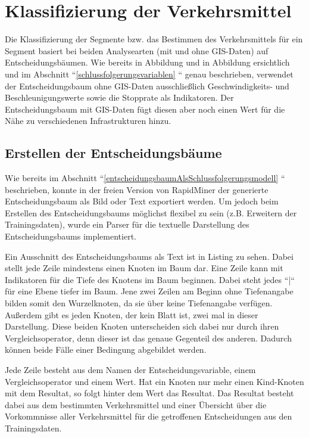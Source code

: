 \section{Klassifizierung der Verkehrsmittel}
Die Klassifizierung der Segmente bzw. das Bestimmen des Verkehrsmittels für ein Segment basiert bei beiden Analysearten (mit und ohne GIS-Daten) auf Entscheidungsbäumen. Wie bereits in Abbildung  und in Abbildung  ersichtlich und im Abschnitt ``\ref{schlussfolgerungsvariablen} `` genau beschrieben, verwendet der Entscheidungsbaum ohne GIS-Daten ausschließlich Geschwindigkeits- und Beschleunigungswerte sowie die Stopprate als Indikatoren. Der Entscheidungsbaum mit GIS-Daten fügt diesen aber noch einen Wert für die Nähe zu verschiedenen Infrastrukturen hinzu.

\subsection{Erstellen der Entscheidungsbäume}
\label{entscheidungsbaumGenerierungPHP}
Wie bereits im Abschnitt ``\ref{entscheidungsbaumAlsSchlussfolgerungsmodell} `` beschrieben, konnte in der freien Version von RapidMiner der generierte Entscheidungsbaum als Bild oder Text exportiert werden. Um jedoch beim Erstellen des Entscheidungsbaums möglichst flexibel zu sein (z.B. Erweitern der Trainingsdaten), wurde ein Parser für die textuelle Darstellung des Entscheidungsbaums implementiert. 

Ein Ausschnitt des Entscheidungsbaums als Text ist in Listing  zu sehen. Dabei stellt jede Zeile mindestens einen Knoten im Baum dar. Eine Zeile kann mit Indikatoren für die Tiefe des Knotens im Baum beginnen. Dabei steht jedes ``|`` für eine Ebene tiefer im Baum. Jene zwei Zeilen am Beginn ohne Tiefenangabe bilden somit den Wurzelknoten, da sie über keine Tiefenangabe verfügen. Außerdem gibt es jeden Knoten, der kein Blatt ist, zwei mal in dieser Darstellung. Diese beiden Knoten unterscheiden sich dabei nur durch ihren Vergleichsoperator, denn dieser ist das genaue Gegenteil des anderen. Dadurch können beide Fälle einer Bedingung abgebildet werden.

Jede Zeile besteht aus dem Namen der Entscheidungsvariable, einem Vergleichsoperator und einem Wert. Hat ein Knoten nur mehr einen Kind-Knoten mit dem Resultat, so folgt hinter dem Wert das Resultat. Das Resultat besteht dabei aus dem bestimmten Verkehrsmittel und einer Übersicht über die Vorkommnisse aller Verkehrsmittel für die getroffenen Entscheidungen aus den Trainingsdaten.

